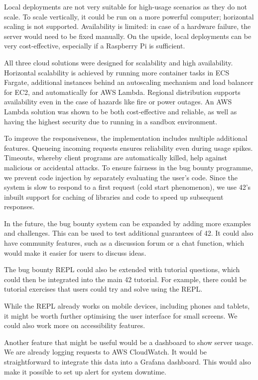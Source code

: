 Local deployments are not very suitable for high-usage scenarios as they do not scale. To scale vertically, it could be run on a more powerful computer; horizontal scaling is not supported. Availability is limited: in case of a hardware failure, the server would need to be fixed manually. On the upside, local deployments can be very cost-effective, especially if a Raspberry Pi is sufficient.

All three cloud solutions were designed for scalability and high availability. Horizontal scalability is achieved by running more container tasks in ECS Fargate, additional instances behind an autoscaling mechanism and load balancer for EC2, and automatically for AWS Lambda. Regional distribution supports availability even in the case of hazards like fire or power outages. An AWS Lambda solution was shown to be both cost-effective and reliable, as well as having the highest security due to running in a sandbox environment.

To improve the responsiveness, the implementation includes multiple additional features. Queueing incoming requests ensures reliability even during usage spikes. Timeouts, whereby client programs are automatically killed, help against malicious or accidental attacks. To ensure fairness in the bug bounty programme, we prevent code injection by separately evaluating the user's code. Since the system is slow to respond to a first request (cold start phenomenon), we use 42's inbuilt support for caching of libraries and code to speed up subsequent responses.

In the future, the bug bounty system can be expanded by adding more examples and challenges. This can be used to test additional guarantees of 42. It could also have community features, such as a discussion forum or a chat function, which would make it easier for users to discuss ideas.

The bug bounty REPL could also be extended with tutorial questions, which could then be integrated into the main 42 tutorial. For example, there could be tutorial exercises that users could try and solve using the REPL.

While the REPL already works on mobile devices, including phones and tablets, it might be worth further optimising the user interface for small screens. We could also work more on accessibility features.

Another feature that might be useful would be a dashboard to show server usage. We are already logging requests to AWS CloudWatch. It would be straightforward to integrate this data into a Grafana dashboard. This would also make it possible to set up alert for system downtime.

